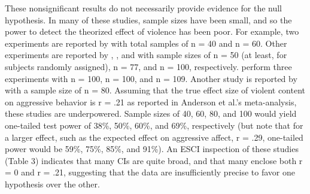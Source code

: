 \documentclass[fignum,nobf,man]{apa}
\begin{document}
These nonsignificant results do not necessarily provide evidence for the null hypothesis. In many of these studies, sample sizes have been small, and so the power to detect the theorized effect of violence has been poor.  For example, two experiments are reported by \citet{Adachi:Willoughby:2011} with total samples of n = 40 and n = 60. Other experiments are reported by \citet{Ferguson:etal:2008}, \citet{Ferguson:Rueda:2010}, and \citet{Valadez:Ferguson:2012} with sample sizes of n = 50 (at least, for subjects randomly assigned), n = 77, and n = 100, respectively. \citet[(Studies 1, 2, and 5)]{Przybylski:etal:2014} %
perform three experiments with n = 100, n = 100, and n = 109. Another study is reported by \citet{Elson:etal:2014} with a sample size of n = 80. Assuming that the true effect size of violent content on aggressive behavior is r = .21 as reported in Anderson et al.'s meta-analysis, these studies are underpowered. Sample sizes of 40, 60, 80, and 100 would yield one-tailed test power of 38\%, 50\%, 60\%, and 69\%, respectively (but note that for a larger effect, such as the expected effect on aggressive affect, r = .29, one-tailed power would be 59\%, 75\%, 85\%, and 91\%). An ESCI inspection of these studies (Table 3) indicates that many CIs are quite broad, and that many enclose both r = 0 and r = .21, suggesting that the data are insufficiently precise to favor one hypothesis over the other. 
\end{document}
